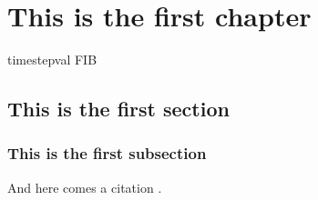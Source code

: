\chapter{This is the first chapter}
\gls{timestepval}
\acrshort{FIB}
\lipsum
\section{This is the first section}
\lipsum
\subsection{This is the first subsection}
\lipsum
And here comes a citation \cite{lovecraft2016el}.
